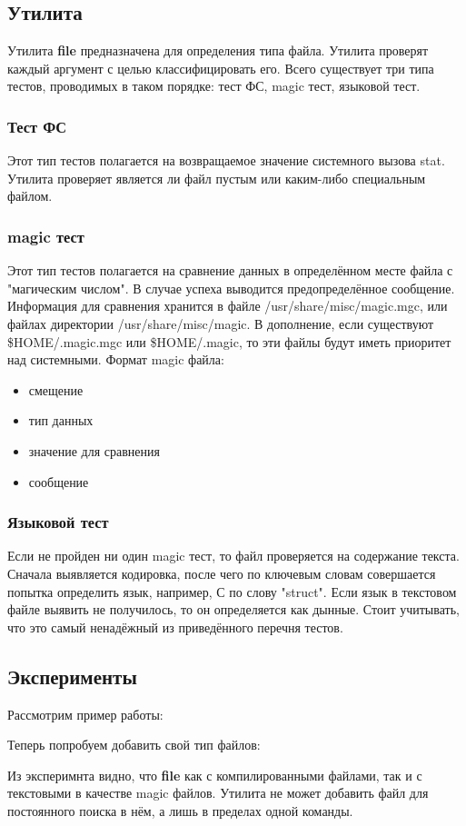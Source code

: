 \documentclass[a4paper]{article}
\begin{document}
\subsection{ Утилита} Утилита \textbf{file} предназначена для определения типа файла. Утилита проверят каждый аргумент с целью классифицировать его. Всего существует три типа тестов, проводимых в таком порядке: тест ФС, magic тест, языковой тест.

\subsubsection{ Тест ФС}
Этот тип тестов полагается на возвращаемое значение системного вызова stat. Утилита проверяет является ли файл пустым или каким-либо специальным файлом.
\subsubsection{ magic тест}
Этот тип тестов полагается на сравнение данных в определённом месте файла с "магическим числом". В случае успеха выводится предопределённое сообщение. Информация для сравнения хранится в файле /usr/share/misc/magic.mgc, или файлах директории /usr/share/misc/magic.  В дополнение, если существуют \$HOME/.magic.mgc или \$HOME/.magic, то эти файлы будут иметь приоритет над системными. Формат magic файла:
\begin{itemize}
\item смещение
\item тип данных
\item значение для сравнения
\item сообщение
\end{itemize}

\subsubsection{ Языковой тест}
Если не пройден ни один magic тест, то файл проверяется на содержание текста. Сначала выявляется кодировка, после чего по ключевым словам совершается попытка определить язык, например, С по слову "struct". Если язык в текстовом файле выявить не получилось, то он определяется как дынные. Стоит учитывать, что это самый ненадёжный из приведённого перечня тестов. 

\subsection{ Эксперименты}
Рассмотрим пример работы:


Теперь попробуем добавить свой тип файлов:

Из эксперимнта  видно, что  \textbf{file} как с компилированными файлами, так и с текстовыми в качестве  magic файлов. Утилита не может добавить файл для постоянного поиска в нём, а лишь в пределах одной команды.
\end{document}
